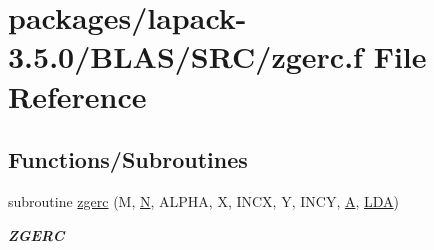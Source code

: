 \hypertarget{lapack-3_85_80_2BLAS_2SRC_2zgerc_8f}{}\section{packages/lapack-\/3.5.0/\+B\+L\+A\+S/\+S\+R\+C/zgerc.f File Reference}
\label{lapack-3_85_80_2BLAS_2SRC_2zgerc_8f}
\subsection*{Functions/\+Subroutines}
\begin{DoxyCompactItemize}
\item 
subroutine \hyperlink{group__complex16__blas__level2_ga88dcc222d4bdf735fb9ff1bdbb0d8f82}{zgerc} (M, \hyperlink{polmisc_8c_a0240ac851181b84ac374872dc5434ee4}{N}, A\+L\+P\+H\+A, X, I\+N\+C\+X, Y, I\+N\+C\+Y, \hyperlink{classA}{A}, \hyperlink{example__user_8c_ae946da542ce0db94dced19b2ecefd1aa}{L\+D\+A})
\begin{DoxyCompactList}\small\item\em {\bfseries Z\+G\+E\+R\+C} \end{DoxyCompactList}\end{DoxyCompactItemize}
